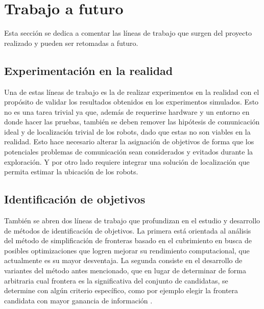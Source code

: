 
\section{Trabajo a futuro}

Esta sección se dedica a comentar las líneas de trabajo que surgen del proyecto
realizado y pueden ser retomadas a futuro.

\subsection{Experimentación en la realidad}

Una de estas líneas de trabajo es la de realizar experimentos en la realidad
con el propósito de validar los resultados obtenidos en los experimentos
simulados. Esto no es una tarea trivial ya que, además de requerirse hardware y
un entorno en donde hacer las pruebas, también se deben remover las hipótesis de
comunicación ideal y de localización trivial de los robots, dado que estas
no son viables en la realidad. Esto hace necesario alterar la
asignación de objetivos de forma que los potenciales problemas de comunicación
sean considerados y evitados durante la exploración. Y por otro lado requiere
integrar una solución de localización que permita estimar la ubicación de los
robots.%

\subsection{Identificación de objetivos}


También se abren dos líneas de trabajo que profundizan en el estudio y
desarrollo de métodos de identificación de objetivos. La primera está orientada
al análisis del método de simplificación de fronteras basado en el cubrimiento
en busca de posibles optimizaciones que logren mejorar su rendimiento
computacional, que actualmente es su mayor desventaja. La segunda consiste en
el desarrollo de variantes del método antes mencionado, que en lugar de
determinar de forma arbitraria cual frontera es la significativa del conjunto
de candidatas, se determine con algún criterio específico, como por ejemplo elegir la
frontera candidata con mayor ganancia de información \cite{Amorin2019}.

